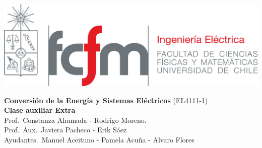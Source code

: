 \documentclass[
  11pt,
  letterpaper,
   addpoints,
   answers
  ]{exam}
\begin{document}
\noindent
\begin{minipage}{0.47\textwidth}
\includegraphics[width=\textwidth]{../fcfm_die}
\end{minipage}
\begin{minipage}{0.53\textwidth}
\begin{center} 
\large\textbf{Conversión de la Energía y Sistemas Eléctricos } (EL4111-1) \\
\large\textbf{Clase auxiliar Extra} \\
\small Prof.~Constanza Ahumada - Rodrigo Moreno.\\
\small Prof.~Aux.~Javiera Pacheco - Erik Sáez\\
\small Ayudantes.~Manuel Aceituno - Pamela Acuña - Alvaro Flores\\
\end{center}
\end{minipage}

\vspace{0.5cm}
\noindent
\vspace{.85cm}
\end{document}

